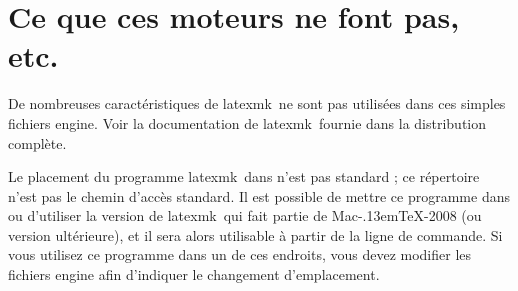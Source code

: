 \documentclass[11pt,french]{article}
\newcommand{\MacTeX}{Mac\kern-.13em\TeX}
\newcommand{\TS}{\textsf{\TeX Shop}}
\newcommand{\latexmk}{\textsf{latexmk}}
\newcommand{\cmd}[1]{\textsf{#1}}
\begin{document}
%
%
%
%
%

\section{Ce que ces moteurs ne font pas, etc.}

De nombreuses caractéristiques de \latexmk\ ne sont pas utilisées dans ces simples fichiers \cmd{engine}. Voir la documentation de \latexmk\ fournie dans la distribution complète.

Le placement du programme \latexmk\ dans  n'est pas standard ; ce répertoire n'est pas le chemin d'accès standard. Il est possible de mettre ce programme dans  ou d'utiliser la version de \latexmk\ qui fait partie de \MacTeX-2008 (ou version ultérieure), et il sera alors utilisable à partir de la ligne de commande. Si vous utilisez ce programme dans un de ces endroits, vous devez modifier les fichiers \cmd{engine} afin d'indiquer le changement d'emplacement.
\end{document}
